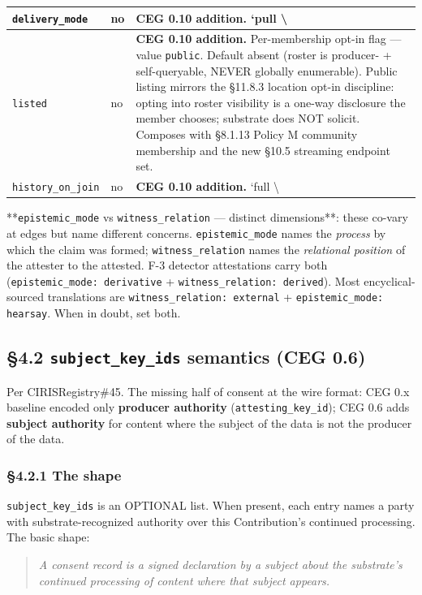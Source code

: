 \documentclass[11pt]{article}
\begin{document}
{\begin{longtable}{|p{5.33cm}|p{5.33cm}|p{5.33cm}|}
\texttt{delivery\_mode} & no & \textbf{CEG 0.10 addition.} `pull \textbackslash{} \\ \hline
\texttt{listed} & no & \textbf{CEG 0.10 addition.} Per-membership opt-in flag — value \texttt{public}. Default absent (roster is producer- + self-queryable, NEVER globally enumerable). Public listing mirrors the §11.8.3 location opt-in discipline: opting into roster visibility is a one-way disclosure the member chooses; substrate does NOT solicit. Composes with §8.1.13 Policy M community membership and the new §10.5 streaming endpoint set. \\ \hline
\texttt{history\_on\_join} & no & \textbf{CEG 0.10 addition.} `full \textbackslash{} \\ \hline
\end{longtable}}


**\texttt{epistemic\_mode} vs \texttt{witness\_relation} — distinct dimensions**: these co-vary at edges but name different concerns. \texttt{epistemic\_mode} names the \textit{process} by which the claim was formed; \texttt{witness\_relation} names the \textit{relational position} of the attester to the attested. F-3 detector attestations carry both (\texttt{epistemic\_mode: derivative} + \texttt{witness\_relation: derived}). Most encyclical-sourced translations are \texttt{witness\_relation: external} + \texttt{epistemic\_mode: hearsay}. When in doubt, set both.


\subsection*{§4.2 \texttt{subject\_key\_ids} semantics (CEG 0.6)}


Per CIRISRegistry\#45. The missing half of consent at the wire format: CEG 0.x baseline encoded only \textbf{producer authority} (\texttt{attesting\_key\_id}); CEG 0.6 adds \textbf{subject authority} for content where the subject of the data is not the producer of the data.


\subsubsection*{§4.2.1 The shape}


\texttt{subject\_key\_ids} is an OPTIONAL list. When present, each entry names a party with substrate-recognized authority over this Contribution's continued processing. The basic shape:


\begin{quote}\itshape A consent record is a signed declaration by a subject about the substrate's continued processing of content where that subject appears.\end{quote}
\end{document}
